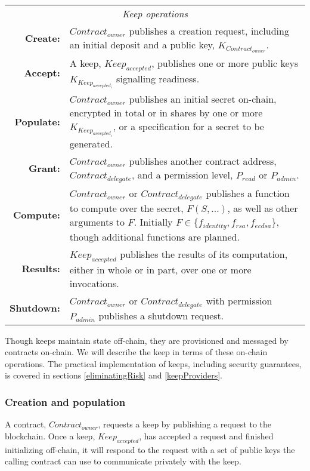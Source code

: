 \documentclass[11pt]{article}
\begin{document}
\begin{table*}[t]
  \centering
  \begin{tabular}{|rp{10cm}|}
  \hline
  \multicolumn{2}{|c|}{\textit{Keep operations}} \\
  \textbf{Create:} & $Contract_{owner}$ publishes a creation request,
  including an initial deposit and a public key,
  $K_{Contract_{owner}}$.\\
  \textbf{Accept:} & A keep, $Keep_{accepted}$, publishes one or more
  public keys $K_{Keep_{accepted_i}}$ signalling readiness.\\
  \textbf{Populate:} & $Contract_{owner}$ publishes an initial
  secret on-chain, encrypted in total or in shares by one or more
  $K_{Keep_{accepted_i}}$, or a specification for a secret to be
  generated.\\
  \textbf{Grant:} & $Contract_{owner}$ publishes another contract
  address, $Contract_{delegate}$, and a permission level, $P_{read}$
  or $P_{admin}$.\\
  \textbf{Compute:} & $Contract_{owner}$ or $Contract_{delegate}$
  publishes a function to compute over the secret, $F(S,...)$, as well
  as other arguments to $F$. Initially $F {\in}
  \{f_{identity},f_{rsa},f_{ecdsa}\}$, though additional functions are
  planned.\\
  \textbf{Results:} & $Keep_{accepted}$ publishes the results
  of its computation, either in whole or in part, over one or more
  invocations.\\
  \textbf{Shutdown:} & $Contract_{owner}$ or $Contract_{delegate}$
  with permission $P_{admin}$ publishes a shutdown request.\\
  \hline
\end{tabular}
\end{table*}

Though keeps maintain state off-chain, they are provisioned and
messaged by contracts on-chain. We will describe the keep in terms of
these on-chain operations. The practical implementation of keeps,
including security guarantees, is covered in sections \ref{eliminatingRisk}
and \ref{keepProviders}.

\subsubsection{Creation and population}

A contract, $Contract_{owner}$, requests a keep by publishing a
request to the blockchain. Once a keep, $Keep_{accepted}$, has accepted a
request and finished initializing off-chain, it will respond to the request
with a set of public keys the calling contract can use to communicate privately
with the keep.
\end{document}
